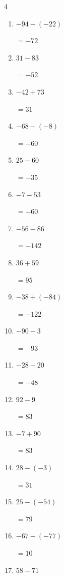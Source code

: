 \begin{multicols}{4}
\begin{enumerate}
        $=-23$

  \item $-94-(-22)$

        $=-72$

  \item $31-83$

        $=-52$

  \item $-42+73$

        $=31$

  \item $-68-(-8)$

        $=-60$

  \item $25-60$

        $=-35$

  \item $-7-53$

        $=-60$

  \item $-56-86$

        $=-142$

\columnbreak %

  \item $36+59$

        $=95$

  \item $-38+(-84)$

        $=-122$

  \item $-90-3$

        $=-93$

  \item $-28-20$

        $=-48$

  \item $92-9$

        $=83$

  \item $-7+90$

        $=83$

  \item $28-(-3)$

        $=31$

  \item $25-(-54)$

        $=79$

  \item $-67-(-77)$

        $=10$

  \item $58-71$


\end{enumerate}
\end{multicols}
